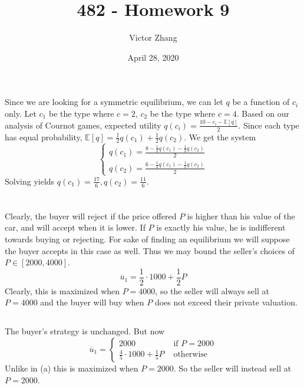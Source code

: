 \documentclass{article}
\title{482 - Homework 9}
\author{Victor Zhang}
\date{April 28, 2020}
\begin{document}
\maketitle

\section{}
Since we are looking for a symmetric equilibrium, we can let $q$ be a function of $c_i$ only. Let $c_1$ be the type where $c = 2$, $c_2$ be the type where $c = 4$. Based on our analysis of Cournot games, expected utility $q(c_i) = \frac{10 - c_i - \mathbb{E}[q]}{2}$. Since each type has equal probability, $\mathbb{E}[q] = \frac{1}{2}q(c_1) + \frac{1}{2}q(c_2)$. We get the system
\begin{equation*}
\begin{cases}
    q(c_1) = \frac{8 - \frac{1}{2}q(c_1) - \frac{1}{2}q(c_2)}{2} \\
    q(c_2) = \frac{6 - \frac{1}{2}q(c_1) - \frac{1}{2}q(c_2)}{2}
\end{cases}
\end{equation*}
Solving yields $q(c_1) = \frac{17}{6}, q(c_2) = \frac{11}{6}$.

\section{}
\subsection{}
Clearly, the buyer will reject if the price offered $P$ is higher than his value of the car, and will accept when it is lower. If $P$ is exactly his value, he is indifferent towards buying or rejecting. For sake of finding an equilibrium we will suppose the buyer accepts in this case as well. Thus we may bound the seller's choices of $P \in [2000,4000]$.
\begin{equation*}
\overline{u}_1 = \frac{1}{2}\cdot1000 + \frac{1}{2} P
\end{equation*}
Clearly, this is maximized when $P = 4000$, so the seller will always sell at $P = 4000$ and the buyer will buy when $P$ does not exceed their private valuation.

\subsection{}
The buyer's strategy is unchanged. But now
\begin{equation}
\overline{u}_1 =
\begin{cases}
2000 &\textrm{ if } P = 2000\\
\frac{4}{5}\cdot1000 + \frac{1}{5} P &\textrm{ otherwise}
\end{cases}
\end{equation}
Unlike in (a) this is maximized when $P = 2000$. So the seller will instead sell at $P = 2000$.
\end{document}
